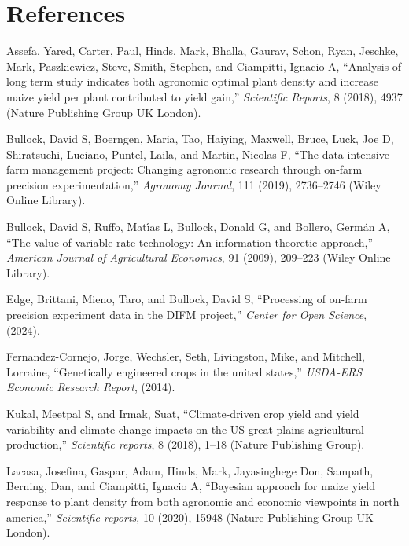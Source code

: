 \documentclass[
]{article}
\newlength{\cslhangindent}
\newenvironment{CSLReferences}[2] %
 {\begin{list}{}{%
  \setlength{\itemindent}{0pt}
  \setlength{\leftmargin}{0pt}
  \setlength{\parsep}{0pt}
  \ifodd #1
   \setlength{\leftmargin}{\cslhangindent}
   \setlength{\itemindent}{-1\cslhangindent}
  \fi
  \setlength{\itemsep}{#2\baselineskip}}}
 {\end{list}}
\begin{document}
\section*{References}\label{references}

\label{refs}
\begin{CSLReferences}{1}{0}
Assefa, Yared, Carter, Paul, Hinds, Mark, Bhalla, Gaurav, Schon, Ryan,
Jeschke, Mark, Paszkiewicz, Steve, Smith, Stephen, and Ciampitti,
Ignacio A, {``Analysis of long term study indicates both agronomic
optimal plant density and increase maize yield per plant contributed to
yield gain,''} \emph{Scientific Reports}, 8 (2018), 4937 (Nature
Publishing Group UK London).

Bullock, David S, Boerngen, Maria, Tao, Haiying, Maxwell, Bruce, Luck,
Joe D, Shiratsuchi, Luciano, Puntel, Laila, and Martin, Nicolas F,
{``The data-intensive farm management project: Changing agronomic
research through on-farm precision experimentation,''} \emph{Agronomy
Journal}, 111 (2019), 2736--2746 (Wiley Online Library).

Bullock, David S, Ruffo, Matı́as L, Bullock, Donald G, and Bollero,
Germán A, {``The value of variable rate technology: An
information-theoretic approach,''} \emph{American Journal of
Agricultural Economics}, 91 (2009), 209--223 (Wiley Online Library).

Edge, Brittani, Mieno, Taro, and Bullock, David S, {``Processing of
on-farm precision experiment data in the DIFM project,''} \emph{Center
for Open Science}, (2024).

Fernandez-Cornejo, Jorge, Wechsler, Seth, Livingston, Mike, and
Mitchell, Lorraine, {``Genetically engineered crops in the united
states,''} \emph{USDA-ERS Economic Research Report}, (2014).

Kukal, Meetpal S, and Irmak, Suat, {``Climate-driven crop yield and
yield variability and climate change impacts on the US great plains
agricultural production,''} \emph{Scientific reports}, 8 (2018), 1--18
(Nature Publishing Group).

Lacasa, Josefina, Gaspar, Adam, Hinds, Mark, Jayasinghege Don, Sampath,
Berning, Dan, and Ciampitti, Ignacio A, {``Bayesian approach for maize
yield response to plant density from both agronomic and economic
viewpoints in north america,''} \emph{Scientific reports}, 10 (2020),
15948 (Nature Publishing Group UK London).


\end{CSLReferences}
\end{document}
